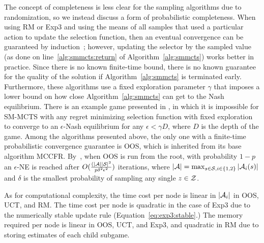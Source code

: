 {The concept of completeness is less clear for the sampling algorithms due to randomization, so we instead discuss a form of probabilistic completeness. 
When using RM or Exp3 and using the means of all samples that used a particular action to update the selection function, then an eventual convergence can be guaranteed by
induction~\cite{lisy2013-nips, Kovarik2015Analysis};
however, updating the selector by the sampled value (as done on line~\ref{alg:smmcts:return} of Algorithm~\ref{alg:smmcts}) works better in practice.
Since there is no known finite-time bound, there is no known guarantee for the quality of the solution if Algorithm~\ref{alg:smmcts} is terminated early.
Furthermore, these algorithms use a fixed exploration parameter $\gamma$ that imposes a lower bound on how close Algorithm~\ref{alg:smmcts} can get to the Nash equilibrium. %
There is an example game presented in \cite{Kovarik2015Analysis}, in which it is impossible for SM-MCTS with any regret minimizing selection function with fixed exploration to converge to an $\epsilon$-Nash equilibrium for any $\epsilon < \gamma D$, where $D$ is the depth of the game.
Among the algorithms presented above, the only one with a finite-time probabilistic convergence guarantee is OOS, which is inherited from its base
algorithm MCCFR. By~\cite[Theorem 5]{Lanctot09Sampling}, when OOS is run from the root, with probability $1-p$ an $\epsilon$-NE is reached after
$O(\frac{(|\mathcal{A}||\mathcal{S}|^2}{p \delta^2 \epsilon^2})$ iterations, where $|\mathcal{A}| = \max_{s \in \mathcal{S}, i \in \{1,2 \}}{|\mathcal{A}_i(s)|}$ and $\delta$ is the smallest
probability of sampling any single $z \in \mathcal{Z}$. 


As for computational complexity, the time cost per node is linear in $|\mathcal{A}_i|$ in OOS, UCT, and RM. The time cost per node
is quadratic in the case
of Exp3 due to the numerically stable update rule (Equation~\ref{eq:exp3:stable}.) 
The memory required per node is linear in OOS, UCT, and Exp3, and quadratic in RM due to storing estimates of each child subgame.
}

